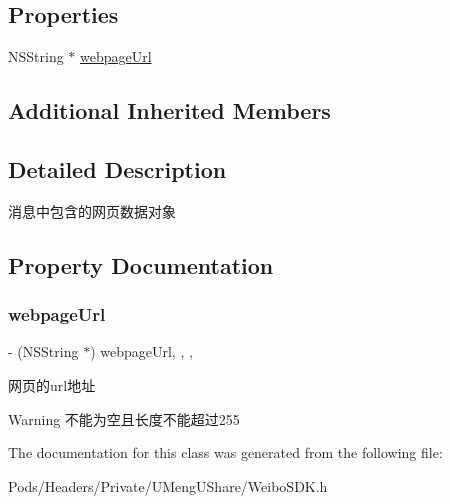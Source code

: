\subsection*{Properties}
\begin{DoxyCompactItemize}
\item 
N\+S\+String $\ast$ \mbox{\hyperlink{interface_w_b_webpage_object_ab7abc7d7dcea87e24ece44aa7c404e3a}{webpage\+Url}}
\end{DoxyCompactItemize}
\subsection*{Additional Inherited Members}


\subsection{Detailed Description}
消息中包含的网页数据对象 

\subsection{Property Documentation}
\mbox{\label{interface_w_b_webpage_object_ab7abc7d7dcea87e24ece44aa7c404e3a}} 
\subsubsection{\texorpdfstring{webpage\+Url}{webpageUrl}}
{\footnotesize\ttfamily -\/ (N\+S\+String $\ast$) webpage\+Url\hspace{0.3cm}{\ttfamily [read]}, {\ttfamily [write]}, {\ttfamily [nonatomic]}, {\ttfamily [strong]}}

网页的url地址

\begin{DoxyWarning}{Warning}
不能为空且长度不能超过255 
\end{DoxyWarning}


The documentation for this class was generated from the following file\+:\begin{DoxyCompactItemize}
\item 
Pods/\+Headers/\+Private/\+U\+Meng\+U\+Share/Weibo\+S\+D\+K.\+h\end{DoxyCompactItemize}
